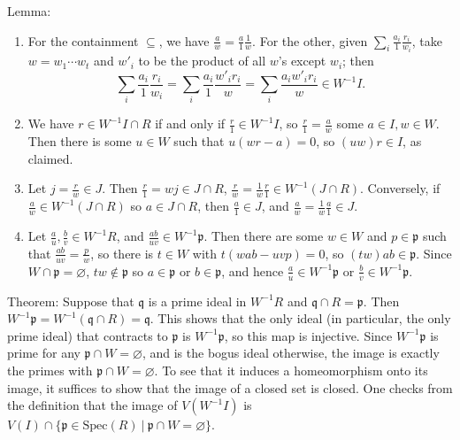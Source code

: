 \documentclass[12pt]{amsart}
\newcommand{\p}{\mathfrak{p}}
\newcommand{\q}{\mathfrak{q}}
\newcommand{\Spec}{\mathrm{Spec}}
\renewcommand{\1}{\mathbbm{1}}
\newcommand{\solution}[1]{\ifthenelse {\equal{\displaysol}{1}} {\begin{framed}{\color{meretale}\noindent #1}\end{framed}} { \ }}
\newcommand\itemB{\stepcounter{enumi}\item[(\theenumi)]}
\begin{document}
\begin{enumerate}
\solution{Lemma:
\begin{enumerate}
\item For the containment $\subseteq$, we have $\frac aw = \frac a1 \frac 1w$. For the other, given $\sum_i \frac{a_i}{1} \frac{r_i}{w_i}$, take $w = w_1\cdots w_t$ and $w'_i$ to be the product of all $w$'s except $w_i$; then
\[ \sum_i \frac{a_i}{1} \frac{r_i}{w_i} = \sum_i \frac{a_i}{1} \frac{w'_i r_i}{w} = \sum_i \frac{a_i w'_i r_i}{w} \in W^{-1}I.\]
\item We have $r \in W^{-1}I \cap R$ if and only if $\frac{r}{1} \in W^{-1}I$, so $\frac{r}{1} = \frac{a}{w}$ some $a\in I, w\in W$. Then there is some $u\in W$ such that $u(wr-a)=0$, so $(uw)r\in I$, as claimed.
\item Let $j=\frac{r}{w}\in J$. Then $\frac{r}{1} = w j\in J \cap R$, $\frac{r}{w} = \frac{1}{w} \frac{r}{1} \in W^{-1}(J\cap R)$. Conversely, if $\frac{a}{w} \in W^{-1}(J\cap R)$ so $a\in J\cap R$, then $\frac{a}{1}\in J$, and $\frac{a}{w}=\frac{1}{w}\frac{a}{1}\in J$.
\item Let $\frac{a}{u}, \frac{b}{v}\in W^{-1}R$, and $\frac{ab}{uv}\in W^{-1}\p$. Then there are some $w\in W$ and $p\in \p$ such that $\frac{ab}{uv} = \frac{p}{w}$, so there is $t\in W$ with $t(wab-uvp)=0$, so $(tw)ab\in \p$. Since $W\cap \p=\varnothing$, $tw\notin \p$ so $a\in \p$ or $b\in \p$, and hence $\frac{a}{u}\in W^{-1}\p$ or $\frac{b}{v}\in W^{-1}\p$.
\end{enumerate}

Theorem:
 Suppose that $\q$ is a prime ideal in $W^{-1}R$ and $\q \cap R=\p$. Then $W^{-1}\p = W^{-1}(\q \cap R) = \q$. This shows that the only ideal (in particular, the only prime ideal) that contracts to $\p$ is $W^{-1}\p$, so this map is injective. Since $W^{-1}\p$ is prime for any $\p \cap W=\varnothing$, and is the bogus ideal otherwise, the image is exactly the primes with $\p \cap W=\varnothing$. To see that it induces a homeomorphism onto its image, it suffices to show that the image of a closed set is closed. One checks from the definition that the image of $V(W^{-1} I)$ is $V(I) \cap \{\p\in \Spec(R) \ | \ \p\cap W=\varnothing\}$. 
}





\end{enumerate}
\end{document}

